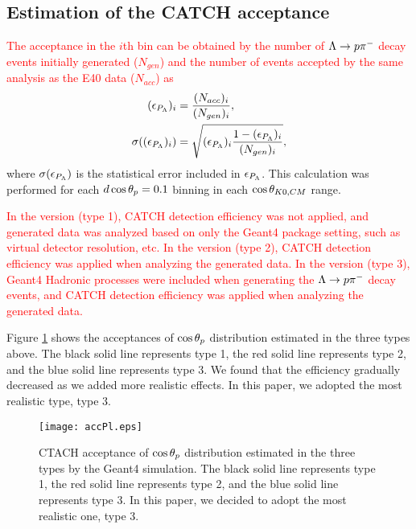\subsection{Estimation of the CATCH acceptance}
\label{sec-Pl-esteff}

\textcolor{red}{ The acceptance in the $i$th bin can be obtained by the number of $\Lambda\to p\pi^{-}$ decay events initially generated ($N_{gen}$) and the number of events accepted by the same analysis as the E40 data ($N_{acc}$) as }
\begin{align}
  (\epsilon_{P_{\Lambda}})_i &= \frac{(N_{acc})_i}{(N_{gen})_i}, \\
  \sigma((\epsilon_{P_{\Lambda}})_i) &= \sqrt{(\epsilon_{P_{\Lambda}})_i \frac{1-(\epsilon_{P_{\Lambda}})_i}{(N_{gen})_i}},
  \label{eq-accPL}
\end{align}
where $\sigma(\epsilon_{P_{\Lambda}})$ is the statistical error included in $\epsilon_{P_{\Lambda}}$. This calculation was performed for each $d\cos{\theta_p}=0.1$ binning in each $\cos{\theta_{K0,CM}}$ range.

\textcolor{red}{ In the  version (type 1), CATCH detection efficiency was not applied, and generated data was analyzed based on only the Geant4 package setting, such as virtual detector resolution, etc. In the  version (type 2), CATCH detection efficiency was applied when analyzing the generated data. In the  version (type 3), Geant4 Hadronic processes were included when generating the $\Lambda\to p\pi^{-}$ decay events, and CATCH detection efficiency was applied when analyzing the generated data. }

Figure \ref{fig-accPl} shows the acceptances of $\cos{\theta_p}$ distribution estimated in the three types above. The black solid line represents type 1, the red solid line represents type 2, and the blue solid line represents type 3. We found that the efficiency gradually decreased as we added more realistic effects. In this paper, we adopted the most realistic type, type 3. %

\begin{figure}[h]
  \centering
  \texttt{[image: accPl.eps]}
  \caption{CTACH acceptance of $\cos{\theta_p}$ distribution estimated in the three types by the Geant4 simulation. The black solid line represents type 1, the red solid line represents type 2, and the blue solid line represents type 3. In this paper, we decided to adopt the most realistic one, type 3.}
  \label{fig-accPl}
\end{figure}


